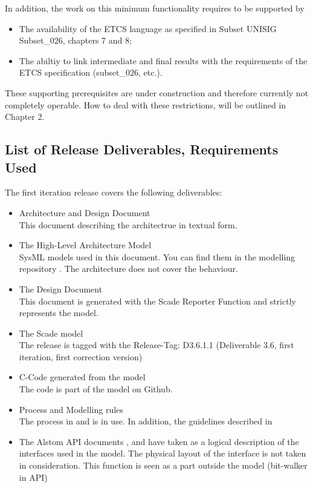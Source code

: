 \documentclass{template/openetcs_report}
\begin{document}
In addition, the work on this minimum functionality requires to be supported by
\begin{itemize}
	\item The availability of the ETCS language as specified in Subset UNISIG Subset\_026, chapters 7 and 8;
	\item The abiltiy to link intermediate and final results with the requirements of the ETCS specification (subset\_026, etc.). 
\end{itemize}
These supporting prerequisites are under construction and therefore currently not completely operable. How to deal with these restrictions, will be outlined in Chapter 2.

\subsection{List of Release Deliverables, Requirements Used}
The first iteration release covers the following deliverables:
\begin{itemize}
\item Architecture and Design Document\\
This document describing the architectrue in textual form.
\item The High-Level Architecture Model\\
SysML models used in this document. You can find them in the modelling repository \cite{sysml-model}. The architecture does not cover the behaviour.
\item The Design Document \cite{designFI}\\
This document is generated with the Scade Reporter Function and strictly represents the model.
\item The Scade model \cite{scade-model}\\
The release is tagged with the Release-Tag: D3.6.1.1 (Deliverable 3.6, first iteration, first correction version)\\
\item C-Code generated from the model\\
The code is part of the model on Github.
\item Process and Modelling rules\\
The process in \cite{D2.4} and \cite{D2.3} is in use. In addition, the guidelines described in \cite{SCADE-Modelling-Guide}
\item The Alstom API documents \cite{alstom-api}, \cite{alstom-api-app-layer} and \cite{alstom-api-data-dict} have taken 
as a logical description of the interfaces used in the model. The physical layout of the interface is not taken in consideration. This function is seen as a part outside the model (bit-walker in API)
\end{itemize}
\end{document}
